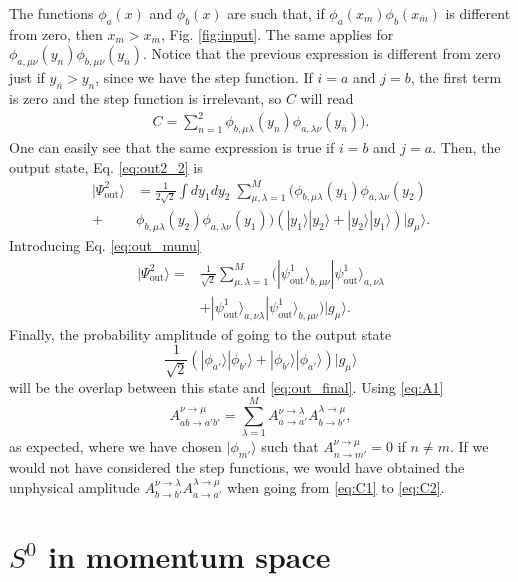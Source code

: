 \documentclass[notitlepage, prx, preprint, amsmath,superscriptaddress,amssymb]{revtex4-1}
\begin{document}
The functions $\phi_a(x)$ and $\phi_b(x)$ are such that, if $\phi_a(x_m)\phi_b(x_{\overline{m}})$ is different from zero, then $x_m>x_{\overline{m}}$, Fig. \ref{fig:input}. The same applies for $\phi_{a,\mu\nu}(y_n)\phi_{b,\mu\nu}(y_{\overline{n}})$. Notice that the previous expression is different from zero just if $y_{\overline{n}}>y_n$, since we have the step function. If $i=a$ and $j=b$, the first term is zero and the step function is irrelevant, so $C$ will read
\begin{align}\label{eq:C2}
C=\sum_{n=1}^2\phi_{b,\mu\lambda}(y_n)\phi_{a,\lambda\nu}(y_{\overline{n}})).
\end{align}
One can easily see that the same expression is true if $i=b$ and $j=a$. Then, the output state, Eq. \eqref{eq:out2_2} is
\begin{align}
|\Psi_\text{out}^2\rangle &=\frac{1}{2\sqrt{2}}\int dy_1dy_2\;\sum_{\mu,\lambda=1}^M(\phi_{b,\mu\lambda}(y_1)\phi_{a,\lambda\nu}(y_2)\nonumber\\
+&\phi_{b,\mu\lambda}(y_2)\phi_{a,\lambda\nu}(y_1))(|y_1\rangle|y_2\rangle + |y_2\rangle|y_1\rangle)|g_\mu\rangle.
\end{align}
Introducing Eq. \eqref{eq:out_munu}
\begin{align}\label{eq:out_final}
|\Psi_\text{out}^2\rangle =&\frac{1}{\sqrt{2}}\sum_{\mu,\lambda=1}^M(|\psi_\text{out}^1\rangle_{b,\mu\nu}|\psi_\text{out}^1\rangle_{a,\nu\lambda}  \nonumber\\
& + |\psi_\text{out}^1\rangle_{a,\nu\lambda}|\psi_\text{out}^1\rangle_{b,\mu\nu})|g_\mu\rangle.
\end{align}
Finally, the probability amplitude of going to the output state
\begin{equation}
\frac{1}{\sqrt{2}}(|\phi_{a'}\rangle|\phi_{b'}\rangle+|\phi_{b'}\rangle|\phi_{a'}\rangle)|g_\mu\rangle
\end{equation}
will be the overlap between this state and \eqref{eq:out_final}. Using \eqref{eq:A1}
\begin{equation}
A_{ab\to a'b'}^{\nu\to\mu}=\sum_{\lambda=1}^M A_{a\to a'}^{\nu\to\lambda} A_{b\to b'}^{\lambda\to\mu},
\end{equation}
as expected, where we have chosen $|\phi_{m'}\rangle$ such that $A_{n\to m'}^{\nu\to \mu}=0$ if $n\neq m$. If we would not have considered the step functions, we would have obtained the unphysical amplitude $A_{b\to b'}^{\nu\to\lambda} A_{a\to a'}^{\lambda\to\mu}$ when going from \eqref{eq:C1} to \eqref{eq:C2}.


\section{$S^0$ in momentum space}\label{app:Sp}
\end{document}
